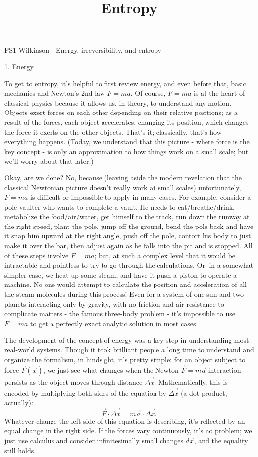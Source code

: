 \documentclass[12pt]{article}
\title{Entropy}
\begin{document}
\setlength{\parindent}{0pt}
\setlength{\parskip}{3mm}

FS1 Wilkinson - Energy, irreversibility, and entropy

1. \underline{Energy}

To get to entropy, it's helpful to first review energy, and even before that, basic mechanics and Newton's 2nd law $F=ma$. Of course, $F=ma$ is at the heart of classical physics because it allows us, in theory, to understand any motion. Objects exert forces on each other depending on their relative positions; as a result of the forces, each object accelerates, changing its position, which changes the force it exerts on the other objects. That's it; classically, that's how everything happens. (Today, we understand that this picture - where force is the key concept - is only an approximation to how things work on a small scale; but we'll worry about that later.)

Okay, are we done? No, because (leaving aside the modern revelation that the classical Newtonian picture doesn't really work at small scales) unfortunately, $F=ma$ is difficult or impossible to apply in many cases. For example, consider a pole vaulter who wants to complete a vault. He needs to eat/breathe/drink, metabolize the food/air/water, get himself to the track, run down the runway at the right speed, plant the pole, jump off the ground, bend the pole back and have it snap him upward at the right angle, push off the pole, contort his body to just make it over the bar, then adjust again as he falls into the pit and is stopped. All of these steps involve $F=ma$; but, at such a complex level that it would be intractable and pointless to try to go through the calculations. Or, in a somewhat simpler case, we heat up some steam, and have it push a piston to operate a machine. No one would attempt to calculate the position and acceleration of all the steam molecules during this process! Even for a system of one sun and two planets interacting only by gravity, with no friction and air resistance to complicate matters - the famous three-body problem - it's impossible to use $F=ma$ to get a perfectly exact analytic solution in most cases.

The development of the concept of energy was a key step in understanding most real-world systems.  Though it took brilliant people a long time to understand and organize the formalism, in hindsight, it's pretty simple: for an object subject to force $\vec{F}(\vec{x})$, we just see what changes when the Newton $\vec{F}=m\vec{a}$ interaction persists as the object moves through distance $\vec{\Delta x}$. Mathematically, this is encoded by multiplying both sides of the equation by $\vec{\Delta x}$ (a dot product, actually):
\begin{equation}
    \vec{F}\cdot \vec{\Delta x} =  m\vec{a}\cdot\vec{\Delta x}.
\end{equation}
Whatever change the left side of this equation is describing, it's reflected by an equal change in the right side.  If the forces vary continuously, it's no problem; we just use calculus and consider infinitesimally small changes $d\vec{x}$, and the equality still holds.
\end{document}
